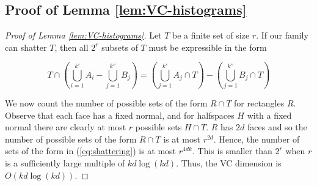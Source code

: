 \documentclass[final,12pt]{colt2018} %
\begin{document}
\subsection{Proof of Lemma \ref{lem:VC-histograms}}
\begin{proof}[Proof of Lemma \ref{lem:VC-histograms}]
Let $T$ be a finite set of size $r$. 
If our family can shatter $T$, then all $2^r$ subsets of $T$ must be expressible in the form

\begin{equation}
\label{eq:shattering}
T \cap \left( \bigcup_{i = 1}^{k'} A_i - \bigcup_{j = 1}^{k''} B_j \right) = \left( \bigcup_{j = 1}^{k'} A_j \cap T \right) - \left( \bigcup_{j = 1}^{k''} B_j \cap T \right)
\end{equation}

We now count the number of possible sets of the form $R \cap T$ for rectangles $R$. 
Observe that each face has a fixed normal, and for halfspaces $H$ with a fixed normal 
there are clearly at most $r$ possible sets $H \cap T$. 
$R$ has $2d$ faces and so the number of possible sets of the form $R \cap T$ 
is at most $r^{2d}$.
Hence, the number of sets of the form in (\ref{eq:shattering}) is at most $r^{4dk}$. This is smaller than $2^r$ when $r$ is a sufficiently large multiple of $kd \log (kd)$. 
Thus, the VC dimension is $O(kd \log (kd))$.
\end{proof}
\end{document}
